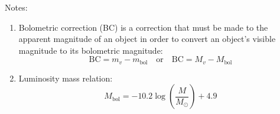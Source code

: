 Notes:
\begin{enumerate}
\item Bolometric correction (BC) is a correction that must be made to the
  apparent magnitude of an object in order to convert an object's visible
  magnitude to its bolometric magnitude:
  \[ \mathrm{BC} = m_v - m_{\mathrm{bol}} \quad \mbox{or} \quad
     \mathrm{BC} = M_v - M_{\mathrm{bol}} \]
\item Luminosity mass relation:
  \[ M_{\mathrm{bol}} = -10.2\log\left(\frac{M}{M_\odot}\right) + 4.9 \]
\end{enumerate}
